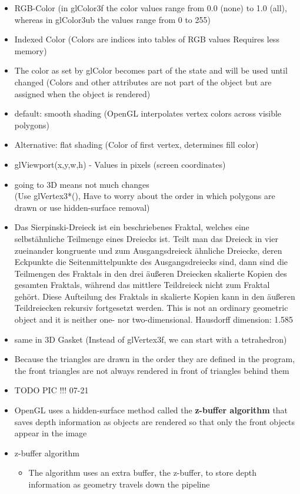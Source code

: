 \documentclass[11pt,a4paper]{article}
\begin{document}
\begin{itemize}
			\item RGB-Color (in glColor3f the color values range from 0.0 (none) to 1.0 (all), whereas in glColor3ub the values range from 0 to 255)
			\item Indexed Color (Colors are indices into tables of RGB values Requires less memory)
			\item The color as set by glColor becomes part of the state and will be used until changed (Colors and other attributes are not part of the object but are assigned when the object is rendered)
			\item default: smooth shading (OpenGL interpolates vertex colors across visible polygons)
			\item Alternative: flat shading (Color of first vertex, determines fill color)
			\item glViewport(x,y,w,h) - Values in pixels (screen coordinates)
			\item going to 3D means not much changes\\
			(Use glVertex3*(), Have to worry about the order in which polygons are drawn or use hidden-surface removal)
			\item Das Sierpinski-Dreieck ist ein beschriebenes Fraktal, welches eine selbstähnliche Teilmenge eines Dreiecks ist. Teilt man das Dreieck in vier zueinander kongruente und zum Ausgangsdreieck ähnliche Dreiecke, deren Eckpunkte die Seitenmittelpunkte des Ausgangsdreiecks sind, dann sind die Teilmengen des Fraktals in den drei äußeren Dreiecken skalierte Kopien des gesamten Fraktals, während das mittlere Teildreieck nicht zum Fraktal gehört. Diese Aufteilung des Fraktals in skalierte Kopien kann in den äußeren Teildreiecken rekursiv fortgesetzt werden. 
			This is not an ordinary geometric object and it is neither one- nor two-dimensional. Hausdorff dimension: 1.585	
			\item same in 3D Gasket (Instead of glVertex3f, we can start with a tetrahedron)
			\item Because the triangles are drawn in the order they are defined in the program, the front triangles are not always rendered in front of triangles behind them
			\item TODO PIC !!! 07-21
			\item OpenGL uses a hidden-surface method called the \textbf{z-buffer algorithm} that saves depth information as objects are rendered so that only the front objects appear in the image
			\item z-buffer algorithm
				\begin{itemize}
					\item The algorithm uses an extra buffer, the z-buffer, to store depth information as geometry travels down the pipeline
				\end{itemize}
			

		\end{itemize}
\end{document}
